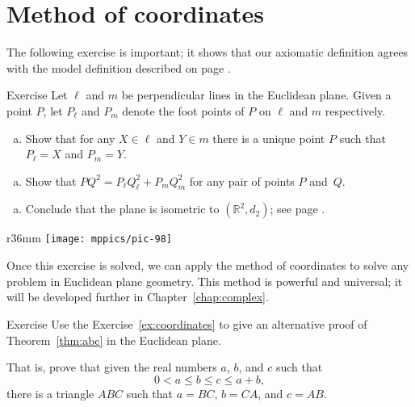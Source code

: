 \section*{Method of coordinates}

The following exercise is important;
it shows that our axiomatic definition agrees with the model definition described on page \pageref{def:d_2}.


\begin{thm}{Exercise}\label{ex:coordinates} 
Let $\ell$ and $m$ be perpendicular lines in the Euclidean plane.
Given a point $P$, let $P_\ell$ and $P_m$ denote the foot points of $P$ on $\ell$ and $m$ respectively.

\begin{enumerate}[(a)]
\item Show that for any $X\in \ell$ and $Y\in m$ there is a unique point $P$ such that $P_\ell=X$ and $P_m=Y$.
\end{enumerate}

\begin{enumerate}[(a)]\addtocounter{enumi}{1}
\item
Show that 
$PQ^2=P_\ell Q_\ell^2+P_mQ_m^2$
for any pair of points $P$ and~$Q$.
\end{enumerate}

\begin{enumerate}[(a)]\addtocounter{enumi}{2}
\item Conclude that the plane is isometric to $(\mathbb{R}^2,d_2)$; see page \pageref{def:d_2}.
\end{enumerate}

\end{thm}

\begin{wrapfigure}{r}{36mm}
\centering
\texttt{[image: mppics/pic-98]}
\end{wrapfigure}

Once this exercise is solved, we can apply 
the method of coordinates
to solve any problem in Euclidean plane geometry.
This method is powerful and universal;
it will be developed further in Chapter~\ref{chap:complex}.

\begin{thm}{Exercise}\label{ex:abc}
Use the Exercise~\ref{ex:coordinates}
to give an alternative proof of Theorem~\ref{thm:abc} in the Euclidean plane.

That is, prove that given the real numbers $a$, $b$, and $c$ such that 
 $$0<a\le b\le c\le a+b,$$
there is a triangle $ABC$
such that $a=BC$, $b=CA$, and $c=AB$.
\end{thm} 

